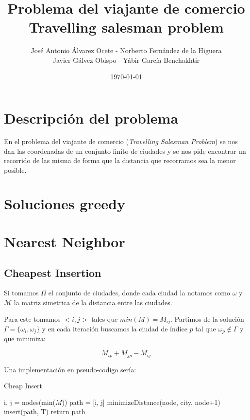 \documentclass{article}
\title{Problema del viajante de comercio\\ Travelling salesman problem}
\author{José Antonio Álvarez Ocete - Norberto Fernández de la Higuera \\ Javier Gálvez Obispo - Yábir García Benchakhtir }
\date{\today}
\begin{document}
\maketitle
\newpage
\tableofcontents
\newpage

\section{Descripción del problema}

En el problema del viajante de comercio (\textit{Travelling Salesman
  Problem}) se nos dan las coordenadas de un conjunto finito de
ciudades y se nos pide encontrar un recorrido de las misma de forma
que la distancia que recorramos sea la menor posible.

\section{Soluciones greedy}

\section{Nearest Neighbor}

\subsection{Cheapest Insertion}

Si tomamos $\Omega$ el conjunto de ciudades, donde cada ciudad la
notamos como $\omega$ y $\mathcal{M}$ la matriz simetrica de la
distancia entre las ciudades.

Para este tomamos $<i,j>$ tales que $min(M) = M_{ij}$. Partimos de la
solución $\Gamma = \{ \omega_i, \omega_j \} $ y en cada iteración
buscamos la ciudad de índice $p$ tal que $\omega_p \notin \Gamma$ y que minimiza:

\[
  M_{ip} + M_{jp} - M_{ij}
\]

Una implementación en pseudo-codigo sería:

\begin{algorithm}[H]
\caption{Cheap Insert}
\begin{algorithmic}
\State i, j = nodes(min($M$))
\State path = [i, j]
\State minimizeDistance(node, city, node+1)
\EndFor
\State insert(path, T)
\EndIf
\EndFor
\State return path
\end{algorithmic}
\end{algorithm}
\end{document}
